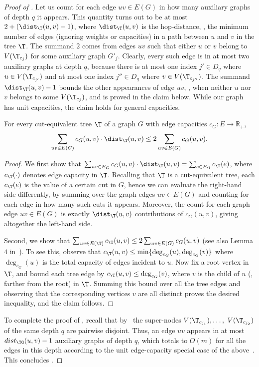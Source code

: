 \begin{proof}[Proof of ]
Let us count for each edge $uv\in E(G)$ in how many auxiliary graphs
of depth $q$ it appears.
This quantity turns out to be at most $2+(\dist_{\T}(u,v)-1)$,
where $\dist_{\T}(u,v)$ is the hop-distance,
\ie, the minimum number of edges (ignoring weights or capacities)
in a path between $u$ and $v$ in the tree $\T$.
The summand $2$ comes from edges $uv$ such that either $u$ or $v$
belong to $V({\T_{c_j}})$ for some auxiliary graph $G'_j$.
Clearly, every such edge is in at most two auxiliary graphs at depth $q$,
because there is at most one index $j'\in D_q$ where $u\in V({\T_{c_{j'}}})$
and at most one index $j''\in D_q$ where $v\in V({\T_{c_{j''}}})$.
The summand $\dist_{\T}(u,v)-1$ bounds the other appearances of edge $uv$,
\ie, when neither $u$ nor $v$ belongs to some $V({\T_{c_j}})$,
and is proved in the claim below.
While our graph has unit capacities, the claim holds for general capacities.

\begin{claim}\label{claim:technical}
For every cut-equivalent tree $\T$ of a graph $G$ with edge capacities $c_G:E\rightarrow \mathbb{R}_+$,
$$
\sum_{uv\in E(G)} c_G(u,v)\cdot\dist_{\T}(u,v)\leq 2\sum_{uv\in E(G)} c_G(u,v).
$$
\end{claim}

\begin{proof}
  We first show that $\sum_{uv\in E_{G}} c_G(u,v)\cdot\dist_{\T}(u,v) = \sum_{e\in E_{\T}} c_{\T}(e)$,
  where $c_{\T}(\cdot)$ denotes edge capacity in $\T$.
  Recalling that $\T$ is a cut-equivalent tree,
  each $c_{\T}(e)$ is the value of a certain cut in $G$,
  hence we can evaluate the right-hand side differently,
  by summing over the graph edges $uv\in E(G)$
  and counting for each edge in how many such cuts it appears.
  Moreover, the count for each graph edge $uv\in E(G)$
  is exactly $\dist_{\T}(u,v)$ contributions of $c_G(u,v)$,
  giving altogether the left-hand side.

  Second, we show that $\sum_{uv\in E(\T)} c_{\T}(u,v)\leq 2\sum_{uv\in E(G)} c_G(u,v)$ (see also Lemma $4$ in~\cite{BHKP07}).
  To see this, observe that $c_{\T}(u,v)\leq \min\{\deg_{c_G}(u), \deg_{c_G}(v)\}$
  where $\deg_{c_G}(u)$ is the total capacity of edges incident to $u$.
  Now fix a root vertex in $\T$,
  and bound each tree edge by $c_{\T}(u,v)\leq \deg_{c_G}(v)$,
  where $v$ is the child of $u$ (\ie, farther from the root) in $\T$.
  Summing this bound over all the tree edges and observing that the corresponding vertices $v$ are all distinct proves the desired inequality,
  and the claim follows.
\end{proof}

To complete the proof of ,
recall that by~ the super-nodes $V(\T_{c_{j_1}}),\ldots,$ $V(\T_{c_{j_2}})$ of the same depth $q$ are pairwise disjoint. Thus, an edge $uv$ appears in at most $dist_{\TG}(u,v)-1$ auxiliary graphs of depth $q$,
which totals to $O(m)$ for all the edges in this depth according to the unit edge-capacity special case of the above~.
This concludes .
\end{proof}

